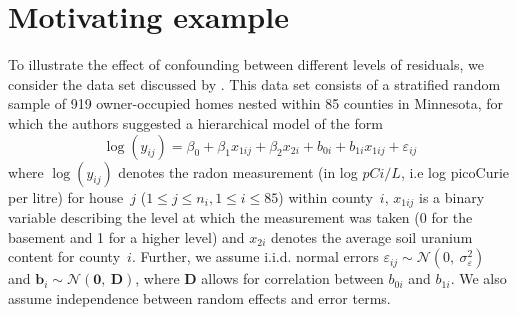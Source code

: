 \documentclass{article} %
\newcommand{\al}[1]{{\color{red} #1}}
\begin{document}
\section{Motivating example}\label{sec:ex}
To illustrate the effect of confounding between different levels of residuals, we consider the data set discussed by
 \cite{Gelman:2006ue}. This data set consists of a stratified random sample of 919 owner-occupied homes nested within 85 counties in Minnesota, for which the authors suggested a hierarchical model of the form
%
\begin{equation}\label{eq:radon}
  \log(y_{ij}) = \beta_0 + \beta_1 x_{1ij} + \beta_2 x_{2i} + b_{0i} + b_{1i} x_{1ij}  + \varepsilon_{ij}
\end{equation}
%
where   $\log(y_{ij})$ denotes the  radon measurement (in log $pCi/L$, i.e log picoCurie per litre) for house~$j$ ($1 \le j \le n_i, 1 \le i \le 85$) within county~$i$,
 $x_{1ij}$ is a binary variable describing the level at which the measurement was taken (0 for the basement and 1 for a higher level) and $x_{2i}$ denotes the average soil uranium content for  county~$i$. 
 Further, we assume i.i.d. normal errors $\varepsilon_{ij} \sim \mathcal{N} (0,\ \sigma^2_{\varepsilon})$  and $\bm{b}_i \sim \mathcal{N}(\bm{0},\ \bm{D})$, where $\bm{D}$ allows for correlation between $b_{0i}$ and $b_{1i}$. We also assume independence between random effects and error \al{terms}. 
\end{document}
